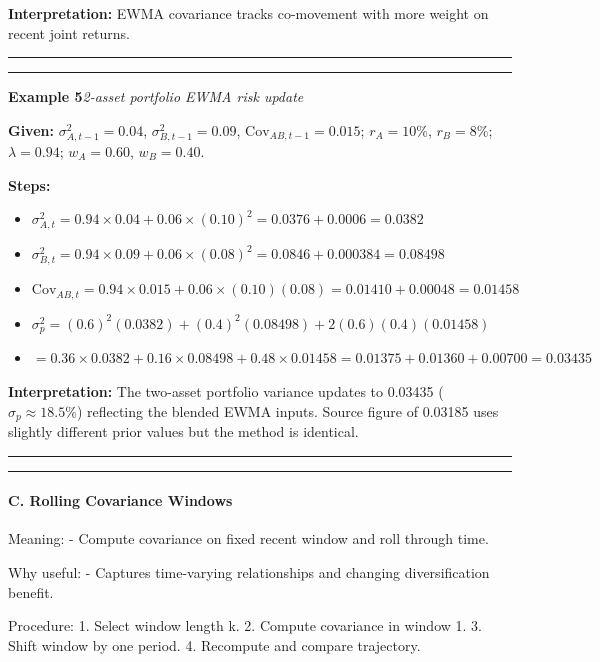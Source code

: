 \documentclass[
]{article}
\begin{document}
\noindent\textbf{Interpretation:} EWMA covariance tracks co-movement with more weight on recent joint returns.

\noindent\rule{\linewidth}{0.4pt}
\medskip
\medskip
\noindent\rule{\linewidth}{0.4pt}
\noindent\textbf{Example 5}\enspace\textit{2-asset portfolio EWMA risk update}

\noindent\textbf{Given:} $\sigma^2_{A,t-1}=0.04$, $\sigma^2_{B,t-1}=0.09$, $\text{Cov}_{AB,t-1}=0.015$; $r_A=10\%$, $r_B=8\%$; $\lambda=0.94$; $w_A=0.60$, $w_B=0.40$.

\noindent\textbf{Steps:}
\begin{itemize}\setlength{\itemsep}{3pt}
  \item $\sigma^2_{A,t} = 0.94\times0.04 + 0.06\times(0.10)^2 = 0.0376+0.0006 = 0.0382$
  \item $\sigma^2_{B,t} = 0.94\times0.09 + 0.06\times(0.08)^2 = 0.0846+0.000384 = 0.08498$
  \item $\text{Cov}_{AB,t} = 0.94\times0.015 + 0.06\times(0.10)(0.08) = 0.01410+0.00048 = 0.01458$
  \item $\sigma^2_p = (0.6)^2(0.0382)+(0.4)^2(0.08498)+2(0.6)(0.4)(0.01458)$
  \item $= 0.36\times0.0382 + 0.16\times0.08498 + 0.48\times0.01458 = 0.01375+0.01360+0.00700 = 0.03435$
\end{itemize}

\noindent\textbf{Interpretation:} The two-asset portfolio variance updates to 0.03435 ($\sigma_p\approx18.5\%$) reflecting the blended EWMA inputs. Source figure of 0.03185 uses slightly different prior values but the method is identical.

\noindent\rule{\linewidth}{0.4pt}
\medskip

\begin{center}\rule{0.5\linewidth}{0.5pt}\end{center}

\hypertarget{c.-rolling-covariance-windows}{%
\paragraph{C. Rolling Covariance
Windows}\label{c.-rolling-covariance-windows}}

Meaning: - Compute covariance on fixed recent window and roll through
time.

Why useful: - Captures time-varying relationships and changing
diversification benefit.

Procedure: 1. Select window length k. 2. Compute covariance in window 1.
3. Shift window by one period. 4. Recompute and compare trajectory.
\end{document}
